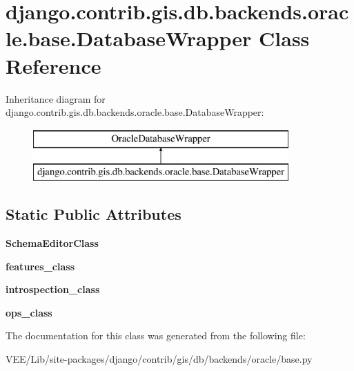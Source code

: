 \hypertarget{classdjango_1_1contrib_1_1gis_1_1db_1_1backends_1_1oracle_1_1base_1_1_database_wrapper}{}\section{django.\+contrib.\+gis.\+db.\+backends.\+oracle.\+base.\+Database\+Wrapper Class Reference}
\label{classdjango_1_1contrib_1_1gis_1_1db_1_1backends_1_1oracle_1_1base_1_1_database_wrapper}
Inheritance diagram for django.\+contrib.\+gis.\+db.\+backends.\+oracle.\+base.\+Database\+Wrapper\+:\begin{figure}[H]
\begin{center}
\leavevmode
\includegraphics[height=2.000000cm]{classdjango_1_1contrib_1_1gis_1_1db_1_1backends_1_1oracle_1_1base_1_1_database_wrapper}
\end{center}
\end{figure}
\subsection*{Static Public Attributes}
\begin{DoxyCompactItemize}
\item 
\mbox{\label{classdjango_1_1contrib_1_1gis_1_1db_1_1backends_1_1oracle_1_1base_1_1_database_wrapper_ac186ca25a999d25b306e2947a48ba430}} 
{\bfseries Schema\+Editor\+Class}
\item 
\mbox{\label{classdjango_1_1contrib_1_1gis_1_1db_1_1backends_1_1oracle_1_1base_1_1_database_wrapper_afeb51a5d101fbb3d3def39d856b44e57}} 
{\bfseries features\+\_\+class}
\item 
\mbox{\label{classdjango_1_1contrib_1_1gis_1_1db_1_1backends_1_1oracle_1_1base_1_1_database_wrapper_a3e11e1a30ea637f9a2d2a2efdaf60826}} 
{\bfseries introspection\+\_\+class}
\item 
\mbox{\label{classdjango_1_1contrib_1_1gis_1_1db_1_1backends_1_1oracle_1_1base_1_1_database_wrapper_afa1a3e6ddc4a3261960eec7d2f7e061d}} 
{\bfseries ops\+\_\+class}
\end{DoxyCompactItemize}


The documentation for this class was generated from the following file\+:\begin{DoxyCompactItemize}
\item 
V\+E\+E/\+Lib/site-\/packages/django/contrib/gis/db/backends/oracle/base.\+py\end{DoxyCompactItemize}

